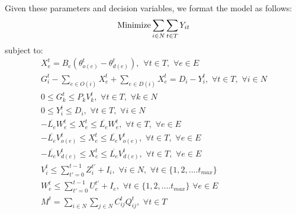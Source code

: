 Given these parameters and decision variables, we format the model as follows:
\begin{equation}
\textnormal{Minimize} \sum_{i \in N} \sum_{t \in T} Y_{it}
\end{equation}
subject to:
\begin{eqnarray}
X_e^t = B_e (\theta_{o(e)}^t - \theta_{d(e)}^t), \hspace{5pt} \forall t \in T, \hspace{4pt} \forall e \in E\\
G_i^t - \sum_{e \in O(i)} X_e^t + \sum_{e \in D(i)} X_e^t = D_i-Y_i^t, \hspace{4pt} \forall t \in T, \hspace{4pt} \forall i \in N\\
0\leq G_k^t \leq P_{k} V_{k}^t, \hspace{4pt} \forall t \in T, \hspace{4pt} \forall k \in N\\
0\leq Y_i^t \leq D_i, \hspace{4pt} \forall t \in T, \hspace{4pt} \forall i \in N\\
-\overline{L_e}W_{e}^t \leq X_{e}^t \leq \overline{L_e}W_{e}^t, \hspace{4pt} \forall t \in T, \hspace{4pt} \forall e \in E\\
-\overline{L_e}V_{o(e)}^t \leq X_{e}^t \leq \overline{L_e}V_{o(e)}^t, \hspace{4pt} \forall t \in T, \hspace{4pt} \forall e \in E\\
-\overline{L_e}V_{d(e)}^t \leq X_{e}^t \leq \overline{L_e}V_{d(e)}^t, \hspace{4pt} \forall t \in T, \hspace{4pt} \forall e \in E\\
V_i^t \leq \sum_{t'=0}^{t-1} Z_i^{t'}+I_i, \hspace{4pt} \forall i \in N, \hspace{4pt} \forall t\in \{1,2,....t_{max}\}\\
W_{e}^t \leq \sum_{t'=0}^{t-1} U_{e}^{t'}+I_e,\hspace{4pt} \forall t\in \{1,2,....t_{max}\} \hspace{4pt} \forall e \in E\\
M^t = \sum_{i \in N} \sum_{j \in N} C_{ij}^t Q_{ij}^{t},  \hspace{4pt} \forall t \in T\\

\end{eqnarray}
